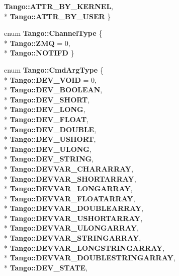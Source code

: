 \begin{DoxyCompactItemize}
{\bf Tango\-::\-A\-T\-T\-R\-\_\-\-B\-Y\-\_\-\-K\-E\-R\-N\-E\-L}, 
\\*
{\bf Tango\-::\-A\-T\-T\-R\-\_\-\-B\-Y\-\_\-\-U\-S\-E\-R}
 \}
\item 
enum {\bf Tango\-::\-Channel\-Type} \{ \\*
{\bf Tango\-::\-Z\-M\-Q} = 0, 
\\*
{\bf Tango\-::\-N\-O\-T\-I\-F\-D}
 \}
\item 
enum {\bf Tango\-::\-Cmd\-Arg\-Type} \{ \\*
{\bf Tango\-::\-D\-E\-V\-\_\-\-V\-O\-I\-D} = 0, 
\\*
{\bf Tango\-::\-D\-E\-V\-\_\-\-B\-O\-O\-L\-E\-A\-N}, 
\\*
{\bf Tango\-::\-D\-E\-V\-\_\-\-S\-H\-O\-R\-T}, 
\\*
{\bf Tango\-::\-D\-E\-V\-\_\-\-L\-O\-N\-G}, 
\\*
{\bf Tango\-::\-D\-E\-V\-\_\-\-F\-L\-O\-A\-T}, 
\\*
{\bf Tango\-::\-D\-E\-V\-\_\-\-D\-O\-U\-B\-L\-E}, 
\\*
{\bf Tango\-::\-D\-E\-V\-\_\-\-U\-S\-H\-O\-R\-T}, 
\\*
{\bf Tango\-::\-D\-E\-V\-\_\-\-U\-L\-O\-N\-G}, 
\\*
{\bf Tango\-::\-D\-E\-V\-\_\-\-S\-T\-R\-I\-N\-G}, 
\\*
{\bf Tango\-::\-D\-E\-V\-V\-A\-R\-\_\-\-C\-H\-A\-R\-A\-R\-R\-A\-Y}, 
\\*
{\bf Tango\-::\-D\-E\-V\-V\-A\-R\-\_\-\-S\-H\-O\-R\-T\-A\-R\-R\-A\-Y}, 
\\*
{\bf Tango\-::\-D\-E\-V\-V\-A\-R\-\_\-\-L\-O\-N\-G\-A\-R\-R\-A\-Y}, 
\\*
{\bf Tango\-::\-D\-E\-V\-V\-A\-R\-\_\-\-F\-L\-O\-A\-T\-A\-R\-R\-A\-Y}, 
\\*
{\bf Tango\-::\-D\-E\-V\-V\-A\-R\-\_\-\-D\-O\-U\-B\-L\-E\-A\-R\-R\-A\-Y}, 
\\*
{\bf Tango\-::\-D\-E\-V\-V\-A\-R\-\_\-\-U\-S\-H\-O\-R\-T\-A\-R\-R\-A\-Y}, 
\\*
{\bf Tango\-::\-D\-E\-V\-V\-A\-R\-\_\-\-U\-L\-O\-N\-G\-A\-R\-R\-A\-Y}, 
\\*
{\bf Tango\-::\-D\-E\-V\-V\-A\-R\-\_\-\-S\-T\-R\-I\-N\-G\-A\-R\-R\-A\-Y}, 
\\*
{\bf Tango\-::\-D\-E\-V\-V\-A\-R\-\_\-\-L\-O\-N\-G\-S\-T\-R\-I\-N\-G\-A\-R\-R\-A\-Y}, 
\\*
{\bf Tango\-::\-D\-E\-V\-V\-A\-R\-\_\-\-D\-O\-U\-B\-L\-E\-S\-T\-R\-I\-N\-G\-A\-R\-R\-A\-Y}, 
\\*
{\bf Tango\-::\-D\-E\-V\-\_\-\-S\-T\-A\-T\-E}, 

\end{DoxyCompactItemize}
